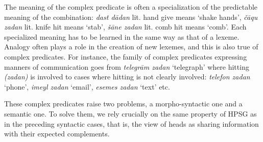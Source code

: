\documentclass[output=paper
                ,modfonts
                ,nonflat
	        ,collection
	        ,collectionchapter
	        ,collectiontoclongg
 	        ,biblatex
                ,babelshorthands
                ,newtxmath
                ,draftmode
                ,colorlinks, citecolor=brown
]{./langsci/langscibook}
\begin{document}
{\begin{exe}
	\ex \label{GSexemple68} 
	\begin{xlist}
        \label{GSexemple68a}
		
	    \label{GSexemple68b}
		
		\end{xlist}
\end{exe}

\begin{exe}
	\ex \label{GSexemple69} 
	\begin{xlist}
        \label{GSexemple69a}
		
	    \label{GSexemple69b}
		
		\end{xlist}
\end{exe}

The meaning of the complex predicate is often a specialization of the predictable meaning of the combination: \textit{dast d\=adan} lit. hand give means `shake hands', \textit{\v c\=aqu zadan} lit. knife hit means `stab', \textit{\v s\=ane zadan} lit. comb hit means `comb'. Each specialized meaning has to be learned in the same way as that of a lexeme. Analogy often plays a role in the creation of new lexemes, and this is also true of complex predicates. For instance, the family of complex predicates expressing manners of communication goes from \textit{telegr\=am zadan} `telegraph' where hitting \textit{(zadan)} is involved to cases where hitting is not clearly involved: \textit{telefon zadan} `phone’, \textit{imeyl zadan} `email', \textit{esemes zadan} `text' etc.   

These complex predicates raise two problems, a morpho-syntactic one and a semantic one. To solve them, we rely crucially on the same property of HPSG as in the preceding syntactic cases, that is, the view of heads as sharing information with their expected complements. 

}
\end{document}
